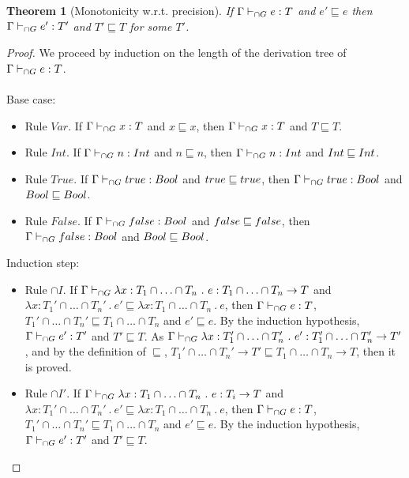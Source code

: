 \documentclass[a4paper]{article}
\newtheorem{theorem}{Theorem}
\begin{document}
\begin{theorem}[Monotonicity w.r.t. precision]
\label{monotonicity_wtr_precision}
If $\Gamma \vdash_{\cap G} e : T$ and $e' \sqsubseteq e$ then $\Gamma \vdash_{\cap G} e' : T'$ and $T' \sqsubseteq T$ for some $T'$.
\end{theorem}
\begin{proof}
We proceed by induction on the length of the derivation tree of $\Gamma \vdash_{\cap G} e : T$.\\\\
Base case:
\begin{itemize}
    \item Rule $Var$.
    If $\Gamma \vdash_{\cap G} x : T$ and $x \sqsubseteq x$, then $\Gamma \vdash_{\cap G} x : T$ and $T \sqsubseteq T$.
    \item Rule $Int$.
    If $\Gamma \vdash_{\cap G} n : {Int}$ and $n \sqsubseteq n$, then $\Gamma \vdash_{\cap G} n : {Int}$ and ${Int} \sqsubseteq {\ensuremath{Int}}$.
    \item Rule $True$.
    If $\Gamma \vdash_{\cap G} true : Bool$ and $true \sqsubseteq true$, then $\Gamma \vdash_{\cap G} true : Bool$ and $Bool \sqsubseteq Bool$.
    \item Rule $False$.
    If $\Gamma \vdash_{\cap G} false : Bool$ and $false \sqsubseteq false$, then $\Gamma \vdash_{\cap G} false : Bool$ and $Bool \sqsubseteq Bool$.
\end{itemize}
Induction step:
\begin{itemize}
    \item Rule ${\cap} I$.
    If $\Gamma \vdash_{\cap G} \lambda x : T_1 \cap \ldots \cap T_n\ .\ e : T_1 \cap \ldots \cap T_n \rightarrow T$ and $\lambda x : T_1' \cap \ldots \cap T_n'\ .\ e' \sqsubseteq \lambda x : T_1 \cap \ldots \cap T_n\ .\ e$, then $\Gamma \vdash_{\cap G} e : T$, $T_1' \cap \ldots \cap T_n' \sqsubseteq T_1 \cap \ldots \cap T_n$ and $e' \sqsubseteq e$.
    By the induction hypothesis, $\Gamma \vdash_{\cap G} e' : T'$ and $T' \sqsubseteq T$.
    As $\Gamma \vdash_{\cap G} \lambda x : T_1' \cap \ldots \cap T_n'\ .\ e' : T_1' \cap \ldots \cap T_n' \rightarrow T'$, and by the definition of $\sqsubseteq$, $T_1' \cap \ldots \cap T_n' \rightarrow T' \sqsubseteq T_1 \cap \ldots \cap T_n \rightarrow T$, then it is proved.
    \item Rule ${\cap} I'$.
    If $\Gamma \vdash_{\cap G} \lambda x : T_1 \cap \ldots \cap T_n\ .\ e : T_i \rightarrow T$ and $\lambda x : T_1' \cap \ldots \cap T_n'\ .\ e' \sqsubseteq \lambda x : T_1 \cap \ldots \cap T_n\ .\ e$, then $\Gamma \vdash_{\cap G} e : T$, $T_1' \cap \ldots \cap T_n' \sqsubseteq T_1 \cap \ldots \cap T_n$ and $e' \sqsubseteq e$.
    By the induction hypothesis, $\Gamma \vdash_{\cap G} e' : T'$ and $T' \sqsubseteq T$.

\end{itemize}
\end{proof}
\end{document}
